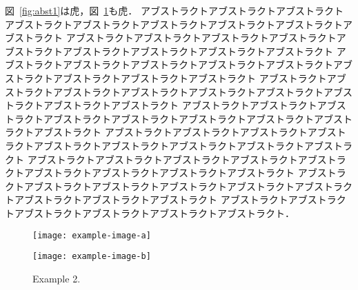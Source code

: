 \documentclass[
    paper=a4paper,      %
    article,            %
    fleqn,              %
    fontsize=12pt,      %
    jafontsize=12pt,    %
    head_space=30mm,    %
    foot_space=20mm,    %
    gutter=18mm,        %
    fore-edge=18mm      %
    ]{jlreq}            %
\begin{document}
図~\ref{fig:abst1}は虎，図~\ref{fig:abst2}も虎．
アブストラクトアブストラクトアブストラクトアブストラクトアブストラクトアブストラクトアブストラクトアブストラクトアブストラクト
アブストラクトアブストラクトアブストラクトアブストラクトアブストラクトアブストラクトアブストラクトアブストラクトアブストラクト
アブストラクトアブストラクトアブストラクトアブストラクトアブストラクトアブストラクトアブストラクトアブストラクトアブストラクト
アブストラクトアブストラクトアブストラクトアブストラクトアブストラクトアブストラクトアブストラクトアブストラクトアブストラクト
アブストラクトアブストラクトアブストラクトアブストラクトアブストラクトアブストラクトアブストラクトアブストラクトアブストラクト
アブストラクトアブストラクトアブストラクトアブストラクトアブストラクトアブストラクトアブストラクトアブストラクトアブストラクト
アブストラクトアブストラクトアブストラクトアブストラクトアブストラクトアブストラクトアブストラクトアブストラクトアブストラクト
アブストラクトアブストラクトアブストラクトアブストラクトアブストラクトアブストラクトアブストラクトアブストラクトアブストラクト
アブストラクトアブストラクトアブストラクトアブストラクトアブストラクトアブストラクト．

\begin{figure}[b]
	\centering
	\begin{minipage}{0.35\columnwidth}
		\centering
		\texttt{[image: example-image-a]}
		\caption{Example 1.}
		\label{fig:abst1}
	\end{minipage}
	\hspace{15mm}
	\begin{minipage}{0.35\columnwidth}
		\centering
		\texttt{[image: example-image-b]}
		\caption{Example 2.}
		\label{fig:abst2}
	\end{minipage}
\end{figure}

\end{document}
